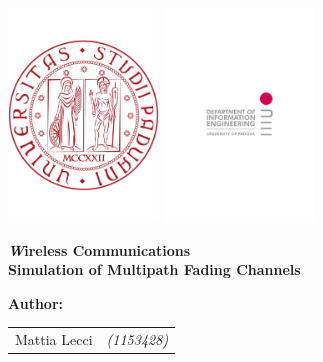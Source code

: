 \begin{titlepage}
	
\centering
{\includegraphics[width=4cm]{img/logo_unipd}
\hspace{7cm}
\includegraphics[width=4cm]{img/logo_dei}
}

\vspace{2cm}
{\bfseries\Large\textit
	Wireless Communications\\
} 
{\bfseries\Huge
	Simulation of Multipath Fading Channels\\
}
\vspace{1cm}
{\large
	\textbf{Author:}
	
	\vspace{5mm}
	
	\normalsize
	\begin{tabular}{ll}
		Mattia Lecci 	& {\footnotesize\textit{(1153428)}} \\ 
	\end{tabular} 
} 
\vfill



\end{titlepage}